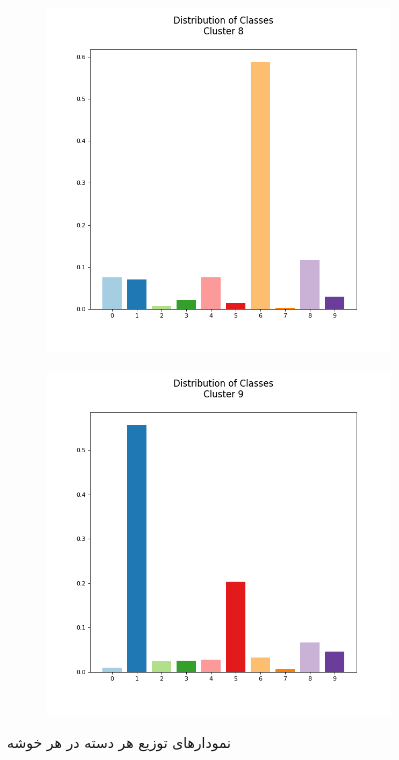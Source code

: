 \documentclass[12pt, a4paper]{article}
\begin{document}
\begin{figure}[h]
\begin{subfigure}{0.3\linewidth}
    \end{subfigure}
    \hfill
    \begin{subfigure}{0.3\linewidth}
        \centering
        \includegraphics[scale=0.15]{images/q4/g/cluster8.png}
    \end{subfigure}
    \newline
    \begin{subfigure}{0.3\linewidth}
        \centering
        \includegraphics[scale=0.15]{images/q4/g/cluster9.png}
    \end{subfigure}
    \caption{نمودار‌های توزیع هر دسته در هر خوشه}
    \label{distribution_in_clusters}
\end{figure}
\end{document}
